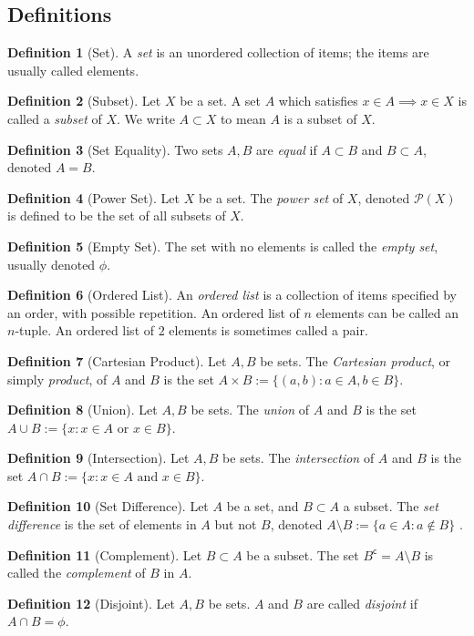 \documentclass{article}
\theoremstyle{definition}
\newtheorem{definition}{Definition}[subsection]
\begin{document}
\subsection{Definitions}
\begin{definition}[Set]
    A \textit{set} is an unordered collection of items; the items are usually called elements. 
\end{definition}
\begin{definition}[Subset]
    Let $X$ be a set. A set $A$ which satisfies $x\in A \implies x\in X$ is called a \textit{subset} of $X$. We write $A\subset X$ to mean $A$ is a subset of $X$.
\end{definition}
\begin{definition}[Set Equality]
    Two sets $A,B$ are \textit{equal} if $A\subset B$ and $B\subset A$, denoted $A=B$.
\end{definition}
\begin{definition}[Power Set] Let $X$ be a set. The \textit{power set} of $X$, denoted $\mathcal{P}(X)$ is defined to be the set of all subsets of $X$.
\end{definition}
\begin{definition}[Empty Set]
    The set with no elements is called the \textit{empty set}, usually denoted $\phi$.
\end{definition}
\begin{definition}[Ordered List]
    An \textit{ordered list} is a collection of items specified by an order, with possible repetition. An ordered list of $n$ elements can be called an $n$-tuple. An ordered list of $2$ elements is sometimes called a pair.
\end{definition}
\begin{definition}[Cartesian Product]
    Let $A,B$ be sets. The \textit{Cartesian product}, or simply \textit{product}, of $A$ and $B$ is the set $A\times B := \{(a,b) : a\in A, b\in B\}$.
\end{definition}
\begin{definition}[Union]
    Let $A,B$ be sets. The \textit{union} of $A$ and $B$ is the set $A\cup B:=\{x:x\in A \text{ or } x\in B\}$.
\end{definition}
\begin{definition}[Intersection]
    Let $A,B$ be sets. The \textit{intersection} of $A$ and $B$ is the set $A\cap B:=\{x:x\in A \text{ and } x\in B\}$.
\end{definition}
\begin{definition}[Set Difference]
    Let $A$ be a set, and $B\subset A$ a subset. The \textit{set difference} is the set of elements in $A$ but not $B$, denoted $A \setminus B:=\{a\in A: a \notin B \}$ .
\end{definition}
\begin{definition}[Complement]
    Let $B\subset A$ be a subset. The set $B^{\mathsf{c}}=A\setminus B$ is called the \textit{complement} of $B$ in $A$.
\end{definition}
\begin{definition}[Disjoint]
    Let $A,B$ be sets. $A$ and $B$ are called \textit{disjoint} if $A\cap B=\phi$.
\end{definition}
\end{document}
